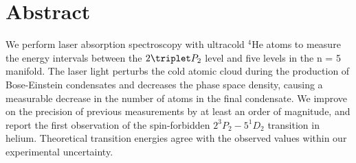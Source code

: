 





\section{Abstract}
We perform laser absorption spectroscopy with ultracold $^4$He atoms to measure the energy intervals between the $2\triplet P_2$ level and five levels in the n = 5 manifold. The laser light perturbs the cold atomic cloud during the production of Bose-Einstein condensates and decreases the phase space density, causing a measurable decrease in the number of atoms in the final condensate. We improve on the precision of previous measurements by at least an order of magnitude, and report the first observation of the spin-forbidden $2^{3\!}P_2 - 5^{1\!}D_2$ transition in helium. Theoretical transition energies agree with the observed values within our experimental uncertainty.



